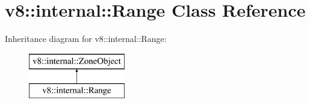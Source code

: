 \hypertarget{classv8_1_1internal_1_1_range}{}\section{v8\+:\+:internal\+:\+:Range Class Reference}
\label{classv8_1_1internal_1_1_range}
Inheritance diagram for v8\+:\+:internal\+:\+:Range\+:\begin{figure}[H]
\begin{center}
\leavevmode
\includegraphics[height=2.000000cm]{classv8_1_1internal_1_1_range}
\end{center}
\end{figure}
